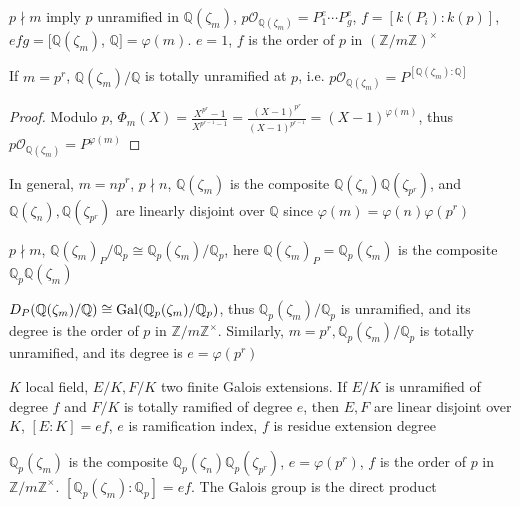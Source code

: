 \documentclass[main]{subfiles}
\begin{document}
$p\nmid m$ imply $p$ unramified in $\mathbb Q(\zeta_m)$, $p\mathcal O_{\mathbb Q(\zeta_m)}=P_1^{e}\cdots P_g^{e}$, $f=[k(P_i):k(p)]$, $efg=[\mathbb Q(\zeta_m)$, $\mathbb Q]=\varphi(m)$. $e=1$, $f$ is the order of $p$ in $(\mathbb Z/m\mathbb Z)^\times$

\begin{lemma}
If $m=p^r$, $\mathbb Q(\zeta_m)/\mathbb Q$ is totally unramified at $p$, i.e. $p\mathcal O_{\mathbb Q(\zeta_m)}=P^{[\mathbb Q(\zeta_m):\mathbb Q]}$
\end{lemma}

\begin{proof}
Modulo $p$, $\Phi_m(X)=\frac{X^{p^r}-1}{X^{p^{r-1}-1}}=\frac{(X-1)^{p^r}}{(X-1)^{p^{r-1}}}=(X-1)^{\varphi(m)}$, thus $p\mathcal O_{\mathbb Q(\zeta_m)}=P^{\varphi(m)}$
\end{proof}

In general, $m=np^r$, $p\nmid n$, $\mathbb Q(\zeta_m)$ is the composite $\mathbb Q(\zeta_n)\mathbb Q(\zeta_{p^r})$, and $\mathbb Q(\zeta_n),\mathbb Q(\zeta_{p^r})$ are linearly disjoint over $\mathbb Q$ since $\varphi(m)=\varphi(n)\varphi(p^r)$

$p\nmid m$, $\mathbb Q(\zeta_m)_P/\mathbb Q_p\cong \mathbb Q_p(\zeta_m)/\mathbb Q_p$, here $\mathbb Q(\zeta_m)_P=\mathbb Q_p(\zeta_m)$ is the composite $\mathbb Q_p\mathbb Q(\zeta_m)$

$D_P(\mathbb Q(\zeta_m)/\mathbb Q)\cong\operatorname{Gal}(\mathbb Q_p(\zeta_m)/\mathbb Q_p)$, thus $\mathbb Q_p(\zeta_m)/\mathbb Q_p$ is unramified, and its degree is the order of $p$ in $\mathbb Z/m\mathbb Z^\times$. Similarly, $m=p^r, \mathbb Q_p(\zeta_m)/\mathbb Q_p$ is totally unramified, and its degree is $e=\varphi(p^r)$

\begin{fact}
$K$ local field, $E/K,F/K$ two finite Galois extensions. If $E/K$ is unramified of degree $f$ and $F/K$ is totally ramified of degree $e$, then $E,F$ are linear disjoint over $K$, $[E:K]=ef$, $e$ is ramification index, $f$ is residue extension degree
\end{fact}

$\mathbb Q_p(\zeta_m)$ is the composite $\mathbb Q_p(\zeta_n)\mathbb Q_p(\zeta_{p^r})$, $e=\varphi(p^r)$, $f$ is the order of $p$ in $\mathbb Z/m\mathbb Z^\times$. $[\mathbb Q_p(\zeta_m):\mathbb Q_p]=ef$. The Galois group is the direct product

\begin{center}
\end{center}
\end{document}
